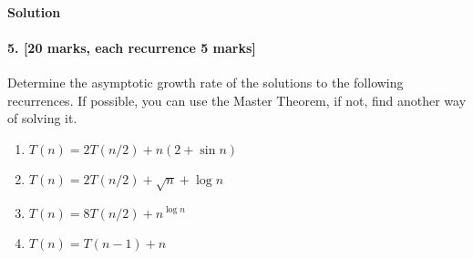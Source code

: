 \documentclass[a4paper]{scrartcl}
\begin{document}
\paragraph{Solution}


\paragraph{5. [20 marks, each recurrence 5 marks]}
\label{sec:Question 5}
Determine the asymptotic growth rate of the solutions to the following recurrences. If possible, you can use the Master Theorem, if not, find another way of solving it.
\begin{enumerate}[label=(\alph*)]
  \item $T (n) = 2T (n/2) + n(2 + \sin{n})$
  \item $T (n) = 2T (n/2) + \sqrt{n} + \log{n}$
  \item $T (n) = 8T (n/2) + n^{\log{n}}$
  \item $T (n) = T (n − 1) + n$
\end{enumerate}
\end{document}
